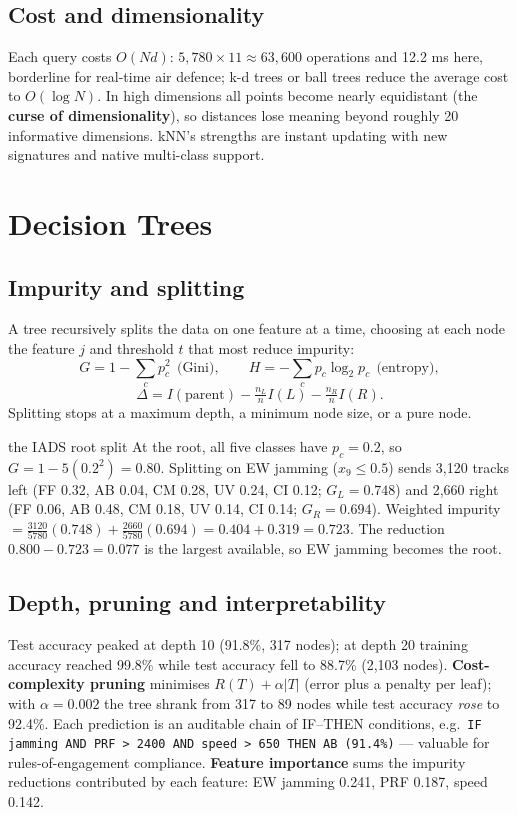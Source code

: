 \documentclass[11pt]{article}
\begin{document}
\subsection{Cost and dimensionality}
Each query costs $O(Nd)$: $5{,}780\times11\approx63{,}600$ operations and 12.2 ms here, borderline for real-time air defence; k-d trees or ball trees reduce the average cost to $O(\log N)$. In high dimensions all points become nearly equidistant (the \textbf{curse of dimensionality}), so distances lose meaning beyond roughly 20 informative dimensions. kNN's strengths are instant updating with new signatures and native multi-class support.

\section{Decision Trees}
\subsection{Impurity and splitting}
A tree recursively splits the data on one feature at a time, choosing at each node the feature $j$ and threshold $t$ that most reduce impurity:
\[G=1-\sum_cp_c^2\ \ \text{(Gini)},\qquad H=-\sum_cp_c\log_2p_c\ \ \text{(entropy)},\]
\[\Delta=I(\text{parent})-\tfrac{n_L}{n}I(L)-\tfrac{n_R}{n}I(R).\]
Splitting stops at a maximum depth, a minimum node size, or a pure node.

\begin{example}{the IADS root split}
At the root, all five classes have $p_c=0.2$, so $G=1-5(0.2^2)=0.80$. Splitting on EW jamming ($x_9\le0.5$) sends 3,120 tracks left (FF 0.32, AB 0.04, CM 0.28, UV 0.24, CI 0.12; $G_L=0.748$) and 2,660 right (FF 0.06, AB 0.48, CM 0.18, UV 0.14, CI 0.14; $G_R=0.694$). Weighted impurity $=\tfrac{3120}{5780}(0.748)+\tfrac{2660}{5780}(0.694)=0.404+0.319=0.723$. The reduction $0.800-0.723=0.077$ is the largest available, so EW jamming becomes the root.
\end{example}

\subsection{Depth, pruning and interpretability}
Test accuracy peaked at depth 10 (91.8\%, 317 nodes); at depth 20 training accuracy reached 99.8\% while test accuracy fell to 88.7\% (2,103 nodes). \textbf{Cost-complexity pruning} minimises $R(T)+\alpha|T|$ (error plus a penalty per leaf); with $\alpha=0.002$ the tree shrank from 317 to 89 nodes while test accuracy \emph{rose} to 92.4\%. Each prediction is an auditable chain of IF--THEN conditions, e.g.\ \texttt{IF jamming AND PRF > 2400 AND speed > 650 THEN AB (91.4\%)} --- valuable for rules-of-engagement compliance. \textbf{Feature importance} sums the impurity reductions contributed by each feature: EW jamming 0.241, PRF 0.187, speed 0.142.
\end{document}

